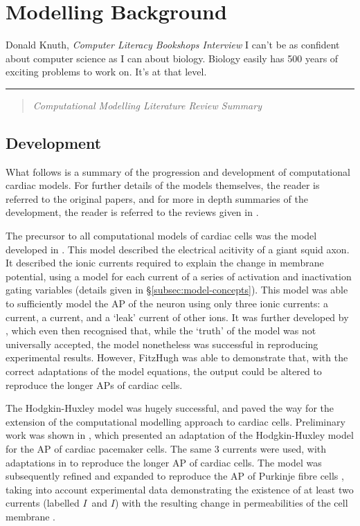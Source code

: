 \documentclass[../thesis-main.tex]{subfiles}
\begin{document}
\chapter{Modelling Background}
\label{ch:comp-litreview}

\begin{aquote}{Donald Knuth, \emph{Computer Literacy Bookshops Interview}}
  {\selectfont
   I can't be as confident about computer science as I can about biology. Biology easily has 500 years of exciting problems to work on. It's at that level.
  }
\end{aquote}
\rule{\linewidth}{0.25mm}

\begin{quote}
 \emph{Computational Modelling Literature Review Summary}
\end{quote}

\section{Development}
\label{sec:model-development}
What follows is a summary of the progression and development of computational cardiac models. For further details of the models themselves, the reader is referred to the original papers, and for more in depth summaries of the development, the reader is referred to the reviews given in \citet{Noble2001, Noble2012, Noble2011, Puglisi2004, Rudy2006, Niederer2009}.

The precursor to all computational models of cardiac cells was the model developed in \citet{Hodgkin1952}. This model described the electrical acitivity of a giant squid axon. It described the ionic currents required to explain the change in membrane potential, using a model for each current of a series of activation and inactivation gating variables (details given in \S\ref{subsec:model-concepts}). This model was able to sufficiently model the AP of the neuron using only three ionic currents: a \K{} current, a \na{} current, and a `leak' current of other ions. It was further developed by \citet{Fitzhugh1960}, which even then recognised that, while the `truth' of the model was not universally accepted, the model nonetheless was successful in reproducing experimental results. However, FitzHugh was able to demonstrate that, with the correct adaptations of the model equations, the output could be altered to reproduce the longer APs of cardiac cells.

The Hodgkin-Huxley model was hugely successful, and paved the way for the extension of the computational modelling approach to cardiac cells. Preliminary work was shown in \citet{Hutter1960, Noble1960}, which presented an adaptation of the Hodgkin-Huxley model for the AP of cardiac pacemaker cells. The same 3 currents were used, with adaptations in \ik{} to reproduce the longer AP of cardiac cells. The model was subsequently refined and expanded to reproduce the AP of Purkinje fibre cells \citep{Noble1962}, taking into account experimental data demonstrating the existence of at least two \K{} currents (labelled $I$~and $I$) with the resulting change in \K{} permeabilities of the cell membrane \citep{Hutter1960, Carmeliet1961, Hall1963}.
\end{document}
